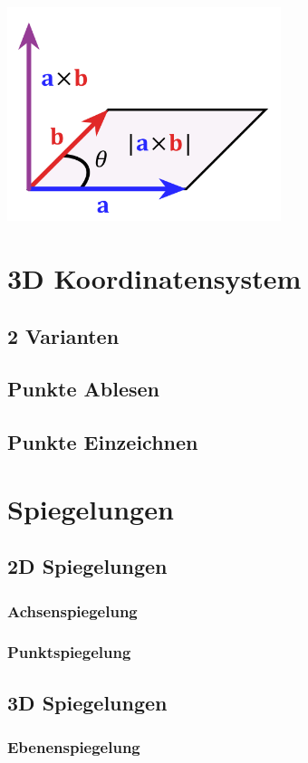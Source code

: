 \begin{center}
    \includegraphics[width=0.6\textwidth]{images/cross-p.png}
\end{center}


\section{3D Koordinatensystem}
\subsection{2 Varianten}
\subsection{Punkte Ablesen}
\subsection{Punkte Einzeichnen}

\section{Spiegelungen}
\subsection{2D Spiegelungen}
\subsubsection*{Achsenspiegelung}
\subsubsection*{Punktspiegelung}
\subsection{3D Spiegelungen}
\subsubsection*{Ebenenspiegelung}

